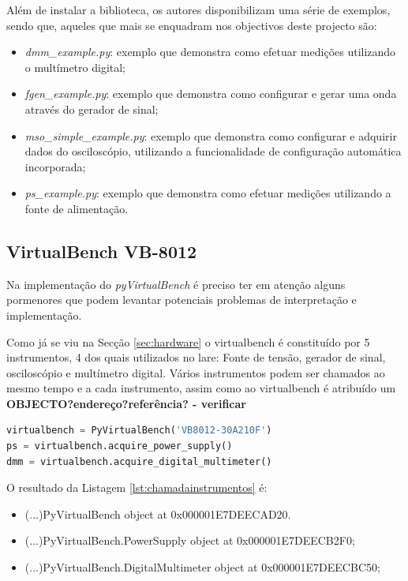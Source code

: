 Além de instalar a biblioteca, os autores disponibilizam uma série de exemplos, sendo que, aqueles que mais se enquadram nos objectivos deste projecto são:
\begin{itemize}
	\item \textit{dmm\_example.py}: exemplo que demonstra como efetuar medições utilizando o multímetro digital;
	\item \textit{fgen\_example.py}: exemplo que demonstra como configurar e gerar uma onda através do gerador de sinal;
	\item \textit{mso\_simple\_example.py}: exemplo que demonstra como configurar e adquirir dados do osciloscópio, utilizando a funcionalidade de configuração automática incorporada;
	\item \textit{ps\_example.py}: exemplo que demonstra como efetuar medições utilizando a fonte de alimentação.
\end{itemize}

\subsection{VirtualBench VB-8012}
\label{sec:VB8012}
Na implementação do \textit{pyVirtualBench} é preciso ter em atenção alguns pormenores que podem levantar potenciais problemas de interpretação e implementação.

Como já se viu na Secção \ref{sec:hardware} o \acrshort{virtualbench} é constituído por 5 instrumentos, 4 dos quais utilizados no \acrshort{lare}: Fonte de tensão, gerador de sinal, osciloscópio e multímetro digital.
Vários instrumentos podem ser chamados ao mesmo tempo e a cada instrumento, assim como ao \acrshort{virtualbench} é atribuído um \textbf{OBJECTO?endereço?referência? - verificar}
\begin{center}
	\begin{minipage}{0.75\linewidth}
		\begin{lstlisting}[language=Python, caption=Chamada do \acrshort{virtualbench} e instrumentos, label=lst:chamadainstrumentos]
virtualbench = PyVirtualBench('VB8012-30A210F')
ps = virtualbench.acquire_power_supply()
dmm = virtualbench.acquire_digital_multimeter()
\end{lstlisting}
	\end{minipage}
\end{center}

O resultado da Listagem \ref{lst:chamadainstrumentos} é:
\begin{itemize}
	\item (...)PyVirtualBench object at 0x000001E7DEECAD20.
	\item (...)PyVirtualBench.PowerSupply object at 0x000001E7DEECB2F0;
	\item (...)PyVirtualBench.DigitalMultimeter object at 0x000001E7DEECBC50;
\end{itemize}

